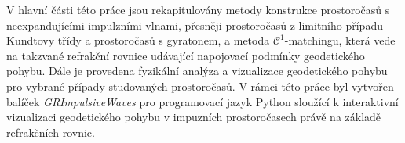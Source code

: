 \documentclass[12pt]{report}
\begin{document}

V hlavní části této práce jsou rekapitulovány metody konstrukce prostoročasů
s neexpandujícími impulzními vlnami, přesněji prostoročasů z limitního případu Kundtovy třídy a
prostoročasů s gyratonem, a metoda $\mathcal{C}^1$-matchingu, která vede na takzvané refrakční rovnice
udávající napojovací podmínky geodetického pohybu. Dále je provedena fyzikální analýza a vizualizace geodetického
pohybu pro vybrané případy studovaných prostoročasů.
V rámci této práce byl vytvořen balíček \emph{GRImpulsiveWaves} pro programovací jazyk Python sloužící k
interaktivní vizualizaci geodetického pohybu v impuzních prostoročasech právě na základě refrakčních rovnic.
\end{document}
